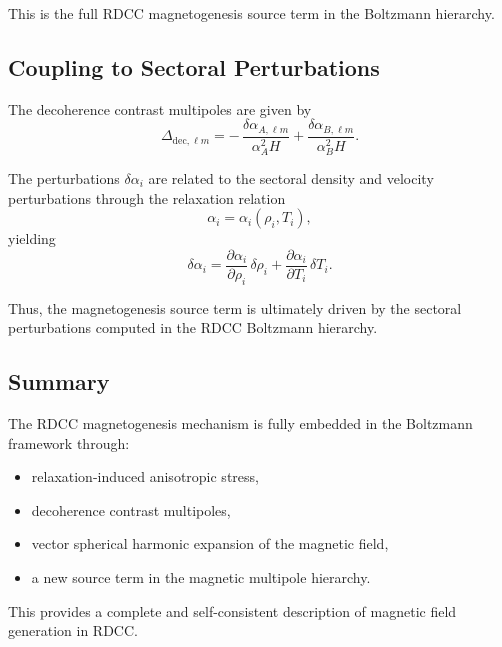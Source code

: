 \documentclass[11pt,a4paper]{article}
\begin{document}
This is the full RDCC magnetogenesis source term in the Boltzmann hierarchy.

\subsection{Coupling to Sectoral Perturbations}

The decoherence contrast multipoles are given by
\begin{equation}
\Delta_{\mathrm{dec},\ell m}
=
-\,\frac{\delta\alpha_{A,\ell m}}{\alpha_{A}^{2}H}
+
\frac{\delta\alpha_{B,\ell m}}{\alpha_{B}^{2}H}.
\end{equation}

The perturbations $\delta\alpha_{i}$ are related to the sectoral density and velocity
perturbations through the relaxation relation
\begin{equation}
\alpha_{i}
=
\alpha_{i}(\rho_{i},T_{i}),
\end{equation}
yielding
\begin{equation}
\delta\alpha_{i}
=
\frac{\partial\alpha_{i}}{\partial\rho_{i}}\,
\delta\rho_{i}
+
\frac{\partial\alpha_{i}}{\partial T_{i}}\,
\delta T_{i}.
\end{equation}

Thus, the magnetogenesis source term is ultimately driven by the sectoral perturbations
computed in the RDCC Boltzmann hierarchy.

\subsection{Summary}

The RDCC magnetogenesis mechanism is fully embedded in the Boltzmann framework through:
\begin{itemize}
\item relaxation-induced anisotropic stress,
\item decoherence contrast multipoles,
\item vector spherical harmonic expansion of the magnetic field,
\item a new source term in the magnetic multipole hierarchy.
\end{itemize}

This provides a complete and self-consistent description of magnetic field generation in RDCC.

\end{document}
